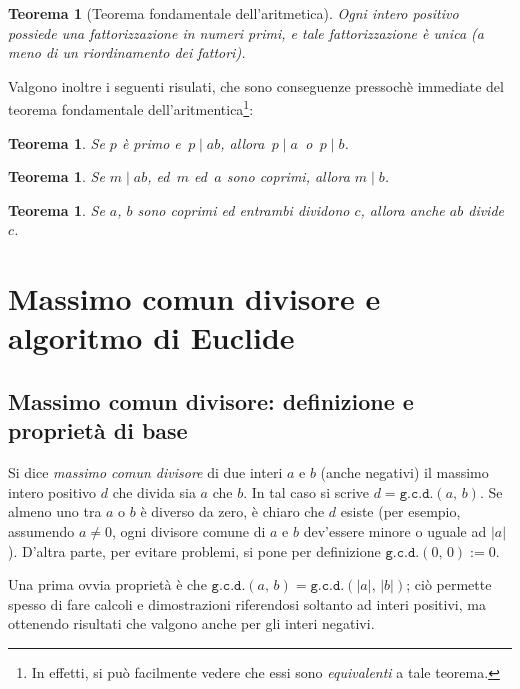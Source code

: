 \documentclass[pdflatex,11pt,a4paper,oneside]{article}
\newcommand{\abs}[1]{\left|{#1}\right|}
\newcommand{\divides}[0]{\mid}
\newcommand{\gcdop}[0]{\ensuremath{\mathtt{g.c.d.}}}
\newcommand{\xgcd}[1]{\ensuremath{\gcdop\left({#1}\right)}}
\renewcommand{\gcd}[2]{\xgcd{{#1},\,{#2}}}
\newtheorem{theorem}[TheoremLike]{Teorema}
\begin{document}
\begin{theorem}[Teorema fondamentale dell'aritmetica]
Ogni intero positivo possiede una fattorizzazione in numeri primi, e
tale fattorizzazione \`e unica (a meno di un riordinamento dei fattori).
\end{theorem}

Valgono inoltre i seguenti risulati, che sono conseguenze pressoch\`e
immediate del teorema fondamentale dell'aritmentica\footnote{In effetti,
si pu\`o facilmente vedere che essi sono \emph{equivalenti} a tale
teorema.}:

\begin{theorem}\label{thm:TFA-c1}
Se $p$ \`e primo e \,$p \divides ab$, allora \,$p \divides a$\, o
\,$p \divides b$.
\end{theorem}

\begin{theorem}\label{thm:TFA-c2}
Se $m \divides ab$, ed\, $m$ ed\, $a$ sono coprimi, allora $m \divides b$.
\end{theorem}

\begin{theorem}\label{thm:TFA-c3}
Se $a$, $b$ sono coprimi ed entrambi dividono $c$, allora
anche $ab$ divide $c$.
\end{theorem}


\section{Massimo comun divisore e algoritmo di Euclide}


\subsection{Massimo comun divisore: definizione e propriet\`a di base}

Si dice \emph{massimo comun divisore} di due interi $a$ e $b$ (anche
negativi) il massimo intero positivo $d$ che divida sia $a$ che $b$.
In tal caso si scrive $d = \gcd{a}{b}$.  Se almeno uno tra $a$ o $b$
\`e diverso da zero, \`e chiaro che $d$ esiste (per esempio, assumendo
$a \neq 0$, ogni divisore comune di $a$ e $b$ dev'essere minore o
uguale ad $\abs{a}$).  D'altra parte, per evitare problemi, si pone
per definizione $\gcd{0}{0} := 0$.

Una prima ovvia propriet\`a \`e che $\gcd{a}{b} = \gcd{\abs{a}}{\abs{b}}$;
ci\`o permette spesso di fare calcoli e dimostrazioni riferendosi soltanto
ad interi positivi, ma ottenendo risultati che valgono anche per gli
interi negativi.
\end{document}
